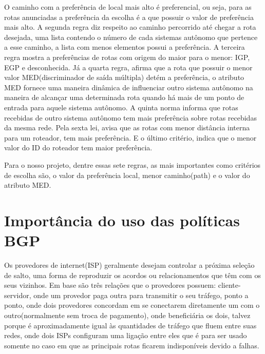\documentclass[12pt,a4paper]{report}
\begin{document}
O caminho com a prefer\^encia de local mais alto \'e preferencial, ou seja, para as rotas anunciadas a prefer\^encia da escolha \'e a que possuir o valor de prefer\^encia mais alto. A segunda regra diz respeito ao caminho percorrido at\'e chegar a rota desejada, uma lista contendo o n\'umero de cada sistemas aut\^onomo que pertence a esse caminho, a lista com menos elementos possui a prefer\^encia. A terceira regra mostra a prefer\^encias de rotas com origem do maior para o menor: IGP, EGP e desconhecida. J\'a a quarta regra, afirma que a rota que possuir o menor valor MED(discriminador de sa\'ida m\'ultipla) det\'em a prefer\^encia, o atributo MED fornece uma maneira din\^amica de influenciar outro sistema aut\^onomo na maneira de alcan\c{c}ar uma determinada rota quando h\'a mais de um ponto de entrada para aquele sistema aut\^onomo. A quinta norma informa que rotas recebidas de outro sistema aut\^onomo tem mais prefer\^encia sobre rotas recebidas da mesma rede. Pela sexta lei, avisa que as rotas com menor dist\^ancia interna para um roteador, tem mais prefer\^encia. E o \'ultimo crit\'erio, indica que o menor valor do ID do roteador tem maior prefer\^encia.

Para o nosso projeto, dentre essas sete regras, as mais importantes como crit\'erios de escolha s\~ao, o valor da prefer\^encia local, menor caminho(path) e o valor do atributo MED.

\section{Import\^ancia do uso das pol\'iticas BGP}

Os provedores de internet(ISP) geralmente desejam controlar a pr\'oxima sele\c{c}\~ao de salto, uma forma de reproduzir os acordos ou relacionamentos que t\^em com os seus vizinhos. Em base s\~ao tr\^es rela\c{c}\~oes que o provedores possuem: cliente-servidor, onde um provedor paga outra para transmitir o seu tr\'afego, ponto a ponto, onde dois provedores concordam em se conectarem diretamente um com o outro(normalmente sem troca de pagamento), onde benefici\'aria os dois, talvez porque \'e aproximadamente igual \`as quantidades de tr\'afego que fluem entre suas redes, onde dois ISPs configuram uma liga\c{c}\~ao entre eles que \'e para ser usado somente no caso em que as principais rotas ficarem indispon\'iveis devido a falhas.\cite{Caesar}
\end{document}
